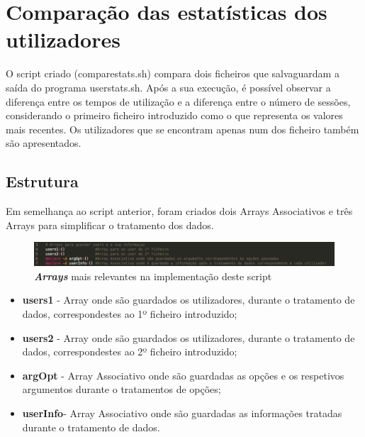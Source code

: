 \documentclass[10pt,portuguese]{article}
\begin{document}
\clearpage
\section{Comparação das estatísticas dos utilizadores}
O script criado (comparestats.sh) compara dois ficheiros que salvaguardam a saída do programa userstats.sh. Após a sua execução, é possível observar a diferença entre os tempos de utilização e a diferença entre o número de sessões, considerando o primeiro ficheiro introduzido como o que representa os valores mais recentes. Os utilizadores que se encontram apenas num dos ficheiro também são apresentados.
\subsection{Estrutura}
\par Em semelhança ao script anterior, foram criados dois Arrays Associativos e três Arrays para simplificar o tratamento dos dados.

\begin{figure}[!h]
    \centering
    \includegraphics[width=\textwidth]{comparestats/estrutura_c.png}
    \caption{\textbf{\textit{Arrays}} mais relevantes na implementação deste script}
\end{figure}
\newline
 \begin{itemize}
   \item {\textbf{users1}}   - Array onde são guardados os utilizadores, durante o tratamento de dados, correspondestes ao 1º ficheiro introduzido;
   \\
   \item {\textbf{users2}}   - Array onde são guardados os utilizadores, durante o tratamento de dados, correspondestes ao 2º ficheiro introduzido;
   \\
   \item {\textbf{argOpt}}  - Array Associativo onde são guardadas as opções e os respetivos argumentos durante o tratamentos de opções;
   \\
   \item {\textbf{userInfo}}- Array Associativo onde são guardadas as informações tratadas durante o tratamento de dados.
 \end{itemize}
\clearpage
\end{document}
